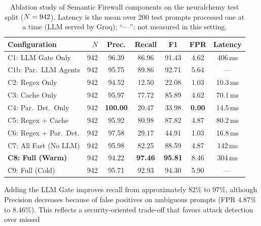 \documentclass[runningheads]{llncs}
\newif\ifrev
\newcommand{\rev}[1]{\ifrev\hl{#1}\else#1\fi}                  %
\newcommand{\revm}[1]{\ifrev\colorbox{yellow}{$#1$}\else#1\fi} %
\begin{document}
\begin{table}[h]
\centering
\scriptsize
\begin{tabular}{@{}lrccccc@{}}
\toprule
\textbf{Configuration}
    & \textbf{$N$} & \textbf{Prec.} & \textbf{Recall}
    & \textbf{F1} & \rev{\textbf{FPR}} & \textbf{Latency} \\
\midrule
C1: LLM Gate Only
    & \rev{942} & \rev{96.39} & \rev{86.96} & \rev{91.43} & \rev{4.62} & \rev{406\,ms} \\
\rev{C1b: Par.~LLM Agents}
    & \rev{942} & \rev{95.75} & \rev{89.86} & \rev{92.71} & \rev{5.64} & \rev{---} \\
C2: Regex Only
    & \rev{942} & \rev{94.52} & \rev{12.50} & \rev{22.08} & \rev{1.03} & \rev{10.3\,ms} \\
C3: Cache Only
    & \rev{942} & \rev{95.97} & \rev{77.72} & \rev{85.89} & \rev{4.62} & \rev{70.1\,ms} \\
C4: Par.\ Det.\ Only
    & \rev{942} & \rev{\textbf{100.00}} & \rev{20.47} & \rev{33.98} & \rev{\textbf{0.00}} & \rev{14.5\,ms} \\
C5: Regex + Cache
    & \rev{942} & \rev{95.92} & \rev{80.98} & \rev{87.82} & \rev{4.87} & \rev{80.2\,ms} \\
C6: Regex + Par.\ Det.
    & \rev{942} & \rev{97.58} & \rev{29.17} & \rev{44.91} & \rev{1.03} & \rev{16.8\,ms} \\
C7: All Fast (No LLM)
    & \rev{942} & \rev{95.98} & \rev{82.25} & \rev{88.59} & \rev{4.87} & \rev{142\,ms} \\
\textbf{C8: Full (Warm)}
    & \rev{942} & \rev{94.22} & \rev{\textbf{97.46}} & \rev{\textbf{95.81}} & \rev{8.46} & \rev{304\,ms} \\
C9: Full (Cold)
    & \rev{942} & \rev{95.71} & \rev{92.93} & \rev{94.30} & \rev{5.90} & \rev{---} \\
\bottomrule
\end{tabular}
\caption{Ablation study of Semantic Firewall components on the neuralchemy \protect\rev{test split} ($N=\protect\revm{942}$). \protect\rev{Latency is the mean over 200 test prompts processed one at a time (LLM served by Groq); ``---'': not measured in this setting.}}
\label{tab:ablation}
\vspace{-7mm}
\end{table}
Adding the LLM Gate improves
recall from approximately \rev{82\% to 97\%}, although Precision decreases
because of false positives on ambiguous prompts\rev{ (FPR 4.87\% to 8.46\%)}. This reflects a
security-oriented trade-off that favors attack detection over missed
\end{document}
